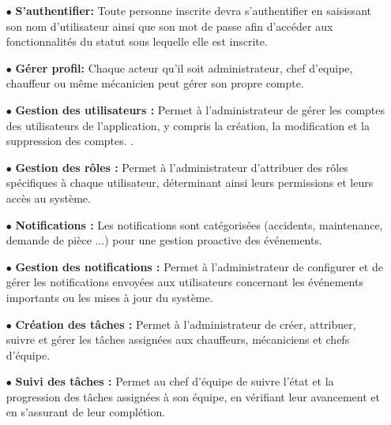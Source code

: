     \begin{itemize}
 
    
     \item[$\bullet$] \textbf {S’authentifier:} Toute personne inscrite devra s’authentifier en saisissant son nom d’utilisateur ainsi que son mot de passe afin d’accéder aux fonctionnalités du statut sous lequelle elle est inscrite.\\
     
        \item[$\bullet$]\textbf{Gérer profil:} Chaque acteur qu’il soit administrateur, chef d'equipe, chauffeur ou même mécanicien peut gérer son propre compte.\\
        
        \item[$\bullet$] \textbf {Gestion des utilisateurs :} Permet à l'administrateur de gérer les comptes des utilisateurs de l'application, y compris la création, la modification et la suppression des comptes. .\\
        
        \item[$\bullet$] \textbf {Gestion des rôles :}  Permet à l'administrateur d'attribuer des rôles spécifiques à chaque utilisateur, déterminant ainsi leurs permissions et leurs accès au système.\\

        \item[$\bullet$] \textbf {Notifications :} Les notifications sont catégorisées (accidents, maintenance, demande de pièce ...) pour une gestion proactive des événements.\\
        
        \item[$\bullet$] \textbf {Gestion des notifications :} Permet à l'administrateur de configurer et de gérer les notifications envoyées aux utilisateurs concernant les événements importants ou les mises à jour du système.\\

        \item[$\bullet$] \textbf {Création des tâches :} Permet à l'administrateur de créer, attribuer, suivre et gérer les tâches assignées aux chauffeurs, mécaniciens et chefs d'équipe. \\
        
        \item[$\bullet$] \textbf {Suivi des tâches :} Permet au chef d'équipe de suivre l'état et la progression des tâches assignées à son équipe, en vérifiant leur avancement et en s'assurant de leur complétion.\\
        

\end{itemize}
